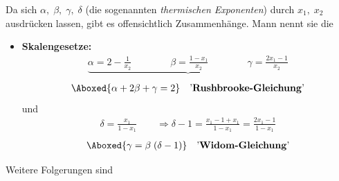 \documentclass[12pt]{article}
\begin{document}
Da sich $\alpha, \; \beta, \; \gamma, \; \delta$ (die sogenannten \textit{thermischen Exponenten}) durch $x_1, \; x_2$ ausdrücken lassen, gibt es offensichtlich Zusammenhänge. Mann nennt sie die \\
\begin{itemize}
\item \textbf{Skalengesetze:}
\begin{align*}
\underbrace{\alpha = 2 - \frac{1}{x_2} \quad \quad \quad \quad \beta = \frac{1- x_1}{x_2} \quad \quad \quad \quad \gamma = \frac{2x_1 - 1}{x_2}} 
\end{align*}
\begin{align}
\Aboxed{ \alpha + 2 \beta + \gamma = 2 } \quad \mbox{'\textbf{Rushbrooke-Gleichung}'}
\end{align}
und \begin{align*}
\delta= \frac{x_1}{1-x_1}  \quad \quad \Rightarrow \delta - 1 = \frac{x_1 - 1 + x_1}{1 - x_1} = \frac{2 x_1 - 1}{1 - x_1}
\end{align*}
\begin{align}
\Aboxed{ \gamma = \beta \; (\delta - 1)} \quad \mbox{'\textbf{Widom-Gleichung}'}
\end{align}
\end{itemize}
Weitere Folgerungen sind
\end{document}
